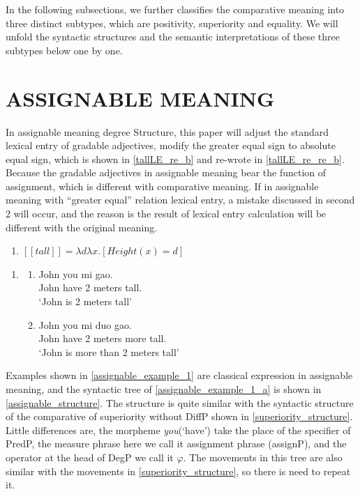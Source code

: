 \documentclass{ctexart}
\begin{document}
In the following subsections, we further classifies the comparative meaning into three distinct subtypes, which are positivity, superiority and equality. We will unfold the syntactic structures and the semantic interpretations of these three subtypes below one by one.

\section{ASSIGNABLE MEANING}

\noindent
In assignable meaning degree Structure, this paper will adjust the standard lexical entry of gradable adjectives, modify the greater equal sign to absolute equal sign, which is shown in \ref{tallLE_re_b} and re-wrote in \ref{tallLE_re_re_b}. Because the gradable adjectives in assignable meaning bear the function of assignment, which is different with comparative meaning. If in assignable meaning with ``greater equal'' relation lexical entry, a mistake discussed in second 2 will occur, and the reason is the result of lexical entry calculation will be different with the original meaning. 

\begin{enumerate}
    \item \label{tallLE_re_re_b}
    $[\![tall]\!]=\lambda d \lambda x.[Height(x) = d]$
\end{enumerate}

\begin{enumerate}
    \item \label{assignable_example_1}
    \begin{enumerate}
        \item \label{assignable_example_1_a}
        John you  mi \enspace \enspace \enspace gao. \\
        John have 2 meters tall. \\
        `John is 2 meters tall'
        
        \item \label{assignable_example_1_b}
        John you  mi \enspace \enspace duo \enspace gao. \\
        John have 2 meters more tall. \\
        `John is more than 2 meters tall'
        
    \end{enumerate}
\end{enumerate}

Examples shown in \ref{assignable_example_1} are classical expression in assignable meaning, and the syntactic tree of \ref{assignable_example_1_a} is shown in \ref{assignable_structure}. The structure is quite similar with the syntactic structure of the comparative of superiority without DiffP shown in \ref{superiority_structure}. Little differences are, the morpheme \textit{you}(`have') take the place of the specifier of PredP, the measure phrase here we call it assignment phrase (assignP), and the operator at the head of DegP we call it $\varphi$. The movements in this tree are also similar with the movements in \ref{superiority_structure}, so there is need to repeat it.
\end{document}
